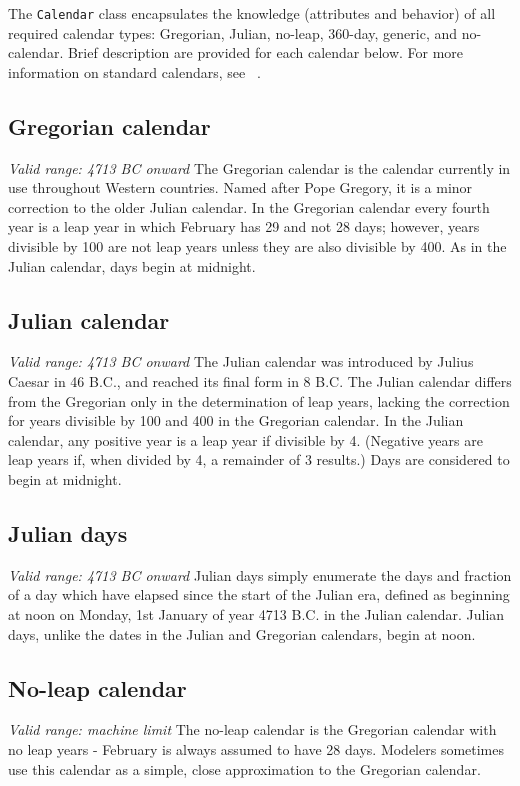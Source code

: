 
\label{sec:Calendar}
The {\tt Calendar} class encapsulates the knowledge (attributes and
behavior) of all required calendar types:  Gregorian, Julian, no-leap,
360-day, generic, and no-calendar.  Brief description are provided for
each calendar below.  For more information on standard calendars, see
~\cite{seidelman}.
            
\subsection{Gregorian calendar}
{\it Valid range: 4713 BC onward}
The Gregorian calendar is the calendar currently in use throughout Western
countries.  Named after Pope Gregory, it is a minor 
correction to the older Julian calendar. In the Gregorian calendar every
fourth year is a leap year in which February has 29 and not 28 days;
however, years divisible by 100 are not leap years unless they are also 
divisible  by 400.  As in the Julian calendar, days begin at midnight.

\subsection{Julian calendar} 
{\it Valid range: 4713 BC onward}
The Julian calendar was introduced by Julius Caesar in 46 B.C., and 
reached its final form in 8 B.C.  The Julian calendar differs from the 
Gregorian only in the determination of leap years, lacking the correction 
for years divisible
by 100 and 400 in the Gregorian calendar. In the Julian calendar, any positive 
year is a leap year if divisible by 4. (Negative years are leap years if, when 
divided by 4, a remainder of 3 results.) Days are considered to begin at 
midnight.

\subsection{Julian days}
{\it Valid range: 4713 BC onward}
Julian days simply enumerate the days and fraction of a day which have elapsed 
since the start of the Julian era, defined as beginning at noon on Monday, 
1st January of year 4713 B.C. in the Julian calendar.  Julian days, 
unlike the dates in the Julian and Gregorian calendars, begin at noon.

\subsection{No-leap calendar}
{\it Valid range: machine limit}
The no-leap calendar is the Gregorian calendar with no leap years - 
February is always assumed to have 28 days.  Modelers sometimes use this 
calendar as a simple, close approximation to the Gregorian calendar.

